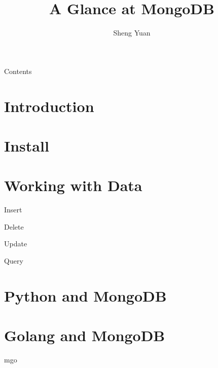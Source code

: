 \documentclass{beamer}
\title{A Glance at MongoDB}
\author{Sheng Yuan}
\begin{document}
    
\begin{frame}
    \titlepage
\end{frame}

\begin{frame}{Contents}
    \tableofcontents
\end{frame}

\section{Introduction}
\begin{frame}
    
\end{frame}

\section{Install}
\begin{frame}
    
\end{frame}

\section{Working with Data}
\begin{frame}{Insert}
    
\end{frame}

\begin{frame}{Delete}
    
\end{frame}

\begin{frame}{Update}
    
\end{frame}

\begin{frame}{Query}
    
\end{frame}

\section{Python and MongoDB}
\begin{frame}

\end{frame}

\section{Golang and MongoDB}
\begin{frame}{mgo}
    
\end{frame}
\end{document}
